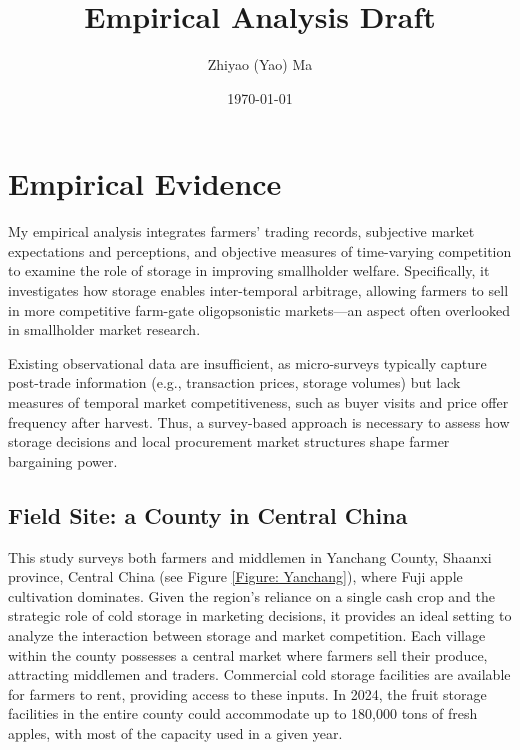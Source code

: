 \documentclass[12pt]{article}
\title{Empirical Analysis Draft}
\author{Zhiyao (Yao) Ma}
\date{\today}
\begin{document}
\maketitle


\section{Empirical Evidence}

\noindent My empirical analysis integrates farmers' trading records, subjective market expectations and perceptions, and objective measures of time-varying competition to examine the role of storage in improving smallholder welfare. Specifically, it investigates how storage enables inter-temporal arbitrage, allowing farmers to sell in more competitive farm-gate oligopsonistic markets—an aspect often overlooked in smallholder market research.

Existing observational data are insufficient, as micro-surveys typically capture post-trade information (e.g., transaction prices, storage volumes) but lack measures of temporal market competitiveness, such as buyer visits and price offer frequency after harvest. Thus, a survey-based approach is necessary to assess how storage decisions and local procurement market structures shape farmer bargaining power.


\subsection{Field Site: a County in Central China}
\noindent This study surveys both farmers and middlemen in Yanchang County, Shaanxi province, Central China (see Figure \ref{Figure: Yanchang}), where Fuji apple cultivation dominates. Given the region's reliance on a single cash crop and the strategic role of cold storage in marketing decisions, it provides an ideal setting to analyze the interaction between storage and market competition. Each village within the county possesses a central market where farmers sell their produce, attracting middlemen and traders. Commercial cold storage facilities are available for farmers to rent, providing access to these inputs. In 2024, the fruit storage facilities in the entire county could accommodate up to 180,000 tons of fresh apples, with most of the capacity used in a given year.
\end{document}
